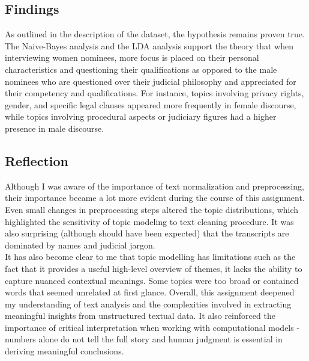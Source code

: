 \documentclass[titlepage]{article}
\begin{document}
\subsection{Findings}
As outlined in the description of the dataset, the hypothesis remains proven true. The Naive-Bayes analysis and the LDA analysis support the theory 
that when interviewing women nominees, more focus is placed on their personal characteristics and questioning their qualifications as opposed to the male 
nominees who are questioned over their judicial philosophy and appreciated for their competency and qualifications.  For instance, topics involving privacy 
rights, gender, and specific legal clauses appeared more frequently in female discourse, while topics involving procedural aspects or judiciary figures had 
a higher presence in male discourse.

\subsection{Reflection}
Although I was aware of the importance of text normalization and preprocessing, their importance became a lot more evident during the course of this assignment. Even small 
changes in preprocessing steps altered the topic distributions, which highlighted the sensitivity of topic modeling to text cleaning procedure. It was also surprising 
(although should have been expected) that the transcripts are dominated by names and judicial jargon. \\

It has also become clear to me that topic modelling has limitations such as the fact that it provides a useful high-level overview of themes, it lacks the ability to 
capture nuanced contextual meanings. Some topics were too broad or contained words that seemed unrelated at first glance. Overall, this assignment deepened my understanding 
of text analysis and the complexities involved in extracting meaningful insights from unstructured textual data. It also reinforced the importance of critical interpretation 
when working with computational models - numbers alone do not tell the full story and human judgment is essential in deriving meaningful conclusions.
\end{document}
